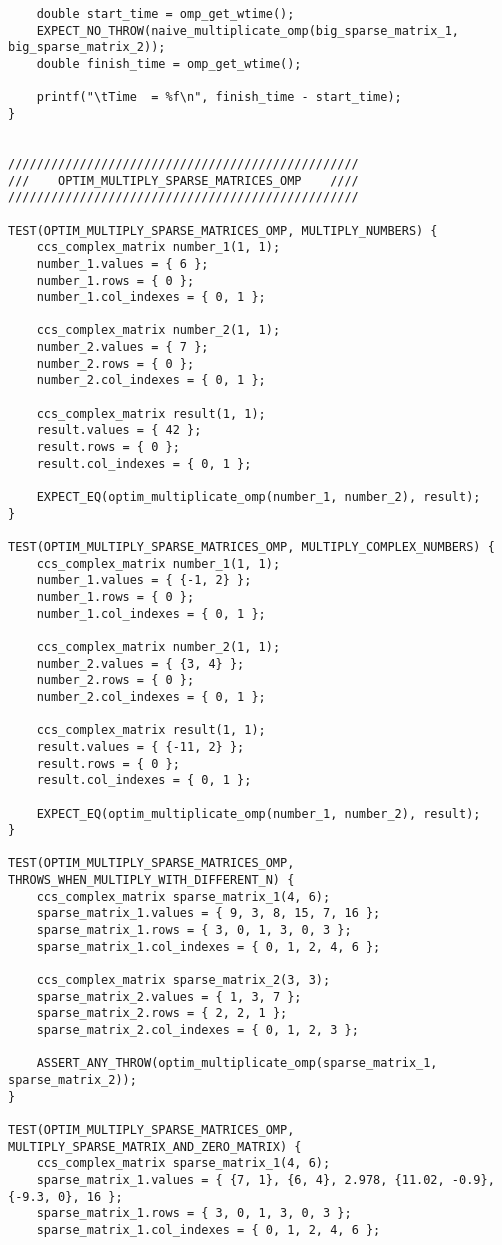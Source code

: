 \documentclass{report}
\begin{document}
\begin{itemize}
\begin{itemize}
\begin{lstlisting}
    double start_time = omp_get_wtime();
    EXPECT_NO_THROW(naive_multiplicate_omp(big_sparse_matrix_1, big_sparse_matrix_2));
    double finish_time = omp_get_wtime();

    printf("\tTime  = %f\n", finish_time - start_time);
}


/////////////////////////////////////////////////
///    OPTIM_MULTIPLY_SPARSE_MATRICES_OMP    ////
/////////////////////////////////////////////////

TEST(OPTIM_MULTIPLY_SPARSE_MATRICES_OMP, MULTIPLY_NUMBERS) {
    ccs_complex_matrix number_1(1, 1);
    number_1.values = { 6 };
    number_1.rows = { 0 };
    number_1.col_indexes = { 0, 1 };

    ccs_complex_matrix number_2(1, 1);
    number_2.values = { 7 };
    number_2.rows = { 0 };
    number_2.col_indexes = { 0, 1 };

    ccs_complex_matrix result(1, 1);
    result.values = { 42 };
    result.rows = { 0 };
    result.col_indexes = { 0, 1 };

    EXPECT_EQ(optim_multiplicate_omp(number_1, number_2), result);
}

TEST(OPTIM_MULTIPLY_SPARSE_MATRICES_OMP, MULTIPLY_COMPLEX_NUMBERS) {
    ccs_complex_matrix number_1(1, 1);
    number_1.values = { {-1, 2} };
    number_1.rows = { 0 };
    number_1.col_indexes = { 0, 1 };

    ccs_complex_matrix number_2(1, 1);
    number_2.values = { {3, 4} };
    number_2.rows = { 0 };
    number_2.col_indexes = { 0, 1 };

    ccs_complex_matrix result(1, 1);
    result.values = { {-11, 2} };
    result.rows = { 0 };
    result.col_indexes = { 0, 1 };

    EXPECT_EQ(optim_multiplicate_omp(number_1, number_2), result);
}

TEST(OPTIM_MULTIPLY_SPARSE_MATRICES_OMP, THROWS_WHEN_MULTIPLY_WITH_DIFFERENT_N) {
    ccs_complex_matrix sparse_matrix_1(4, 6);
    sparse_matrix_1.values = { 9, 3, 8, 15, 7, 16 };
    sparse_matrix_1.rows = { 3, 0, 1, 3, 0, 3 };
    sparse_matrix_1.col_indexes = { 0, 1, 2, 4, 6 };

    ccs_complex_matrix sparse_matrix_2(3, 3);
    sparse_matrix_2.values = { 1, 3, 7 };
    sparse_matrix_2.rows = { 2, 2, 1 };
    sparse_matrix_2.col_indexes = { 0, 1, 2, 3 };

    ASSERT_ANY_THROW(optim_multiplicate_omp(sparse_matrix_1, sparse_matrix_2));
}

TEST(OPTIM_MULTIPLY_SPARSE_MATRICES_OMP, MULTIPLY_SPARSE_MATRIX_AND_ZERO_MATRIX) {
    ccs_complex_matrix sparse_matrix_1(4, 6);
    sparse_matrix_1.values = { {7, 1}, {6, 4}, 2.978, {11.02, -0.9}, {-9.3, 0}, 16 };
    sparse_matrix_1.rows = { 3, 0, 1, 3, 0, 3 };
    sparse_matrix_1.col_indexes = { 0, 1, 2, 4, 6 };


\end{lstlisting}
\end{itemize}
\end{itemize}
\end{document}
